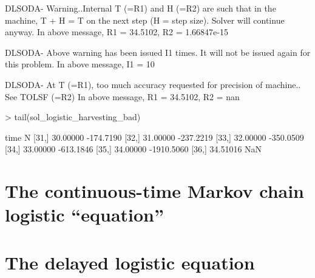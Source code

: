 \documentclass[aspectratio=169]{beamer}
\begin{document}
\begin{frame}[fragile]
\begin{Schunk}
\begin{Soutput}
DLSODA-  Warning..Internal T (=R1) and H (=R2) are
      such that in the machine, T + H = T on the next step  
     (H = step size). Solver will continue anyway.
In above message, R1 = 34.5102, R2 = 1.66847e-15
 
DLSODA-  Above warning has been issued I1 times.  
     It will not be issued again for this problem.
In above message, I1 = 10
 
DLSODA-  At T (=R1), too much accuracy requested  
      for precision of machine..  See TOLSF (=R2) 
In above message, R1 = 34.5102, R2 = nan
\end{Soutput}
\begin{Sinput}
> tail(sol_logistic_harvesting_bad)
\end{Sinput}
\begin{Soutput}
          time          N
[31,] 30.00000  -174.7190
[32,] 31.00000  -237.2219
[33,] 32.00000  -350.0509
[34,] 33.00000  -613.1846
[35,] 34.00000 -1910.5060
[36,] 34.51016        NaN
\end{Soutput}
\end{Schunk}
\end{frame}

\section{The continuous-time Markov chain logistic ``equation''}


\section{The delayed logistic equation}




\end{document}
